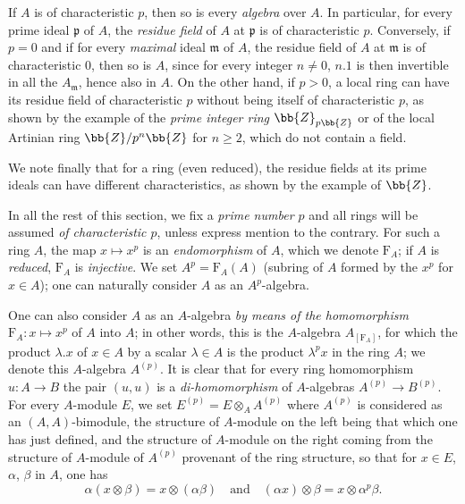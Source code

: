 \begin{env}[21.1.3]
\label{0.21.1.3}
If $A$ is of characteristic $p$, then so is every \emph{algebra} over $A$.
In particular, for every prime ideal $\mathfrak{p}$ of $A$, the \emph{residue field} of $A$ at $\mathfrak{p}$ is of characteristic $p$.
Conversely, if $p=0$ and if for every \emph{maximal} ideal $\mathfrak{m}$ of $A$, the residue field of $A$ at $\mathfrak{m}$ is of characteristic $0$, then so is $A$, since for every integer $n\neq 0$, $n.1$ is then invertible in all the $A_\mathfrak{m}$, hence also in $A$.
On the other hand, if $p>0$, a local ring can have its residue field of characteristic $p$ without being itself of characteristic $p$, as shown by the example of the \emph{prime integer ring} $\bb{Z}_{p\bb{Z}}$  or of the local Artinian ring $\bb{Z}/p^n\bb{Z}$ for $n\geq 2$, which do not contain a field.

We note finally that for a ring (even reduced), the residue fields at its prime ideals can have different characteristics, as shown by the example of $\bb{Z}$.
\end{env}

\begin{env}[21.1.4]
\label{0.21.1.4}
In all the rest of this section, we fix a \emph{prime number $p$} and all rings will be assumed \emph{of characteristic $p$}, unless express mention to the contrary.
For such a ring $A$, the map $x\mapsto x^p$ is an \emph{endomorphism} of $A$, which we denote $\mathrm{F}_A$; if $A$ is \emph{reduced}, $\mathrm{F}_A$ is \emph{injective}.
We set $A^p=\mathrm{F}_A(A)$ (subring of $A$ formed by the $x^p$ for $x\in A$); one can naturally consider $A$ as an $A^p$-algebra.

One can also consider $A$ as an $A$-algebra \emph{by means of the homomorphism} $\mathrm{F}_A:x\mapsto x^p$ of $A$ into $A$; in other words, this is the $A$-algebra $A_{[\mathrm{F}_A]}$, for which the product $\lambda.x$ of $x\in A$ by a scalar $\lambda\in A$ is the product $\lambda^p x$ in the ring $A$; we denote this $A$-algebra $A^{(p)}$.
It is clear that for every ring homomorphism $u:A\to B$ the pair $(u,u)$ is a \emph{di-homomorphism} of $A$-algebras $A^{(p)}\to B^{(p)}$.
For every $A$-module $E$, we set $E^{(p)}=E\otimes_A A^{(p)}$ where $A^{(p)}$ is considered as an $(A,A)$-bimodule, the structure of $A$-module on the left being that which one has just defined, and the structure of $A$-module on the right coming from the structure of $A$-module of $A^{(p)}$ provenant of the ring structure, so that for $x\in E$, $\alpha$, $\beta$ in $A$, one has
\[
  \alpha(x\otimes\beta)=x\otimes(\alpha\beta) \quad\text{and}\quad (\alpha x)\otimes\beta=x\otimes\alpha^p\beta.
\]
\end{env}

